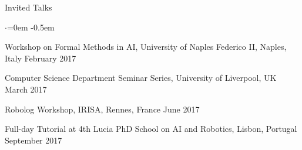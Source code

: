 
\begin{rSection}{Invited Talks}
 \begin{list}{$\cdot$}{\leftmargin=0em} %
   \itemsep -0.5em \vspace{-0.5em} %
  \item Workshop on Formal Methods in AI, University of Naples Federico II, Naples, Italy \hfill February 2017 
\item Computer Science Department Seminar Series, University of Liverpool, UK \hfill March 2017
\item  Robolog Workshop, IRISA, Rennes, France \hfill June 2017
\item Full-day Tutorial at 4th Lucia PhD School on AI and Robotics, Lisbon, Portugal \hfill September 2017
  \end{list}


\end{rSection}
